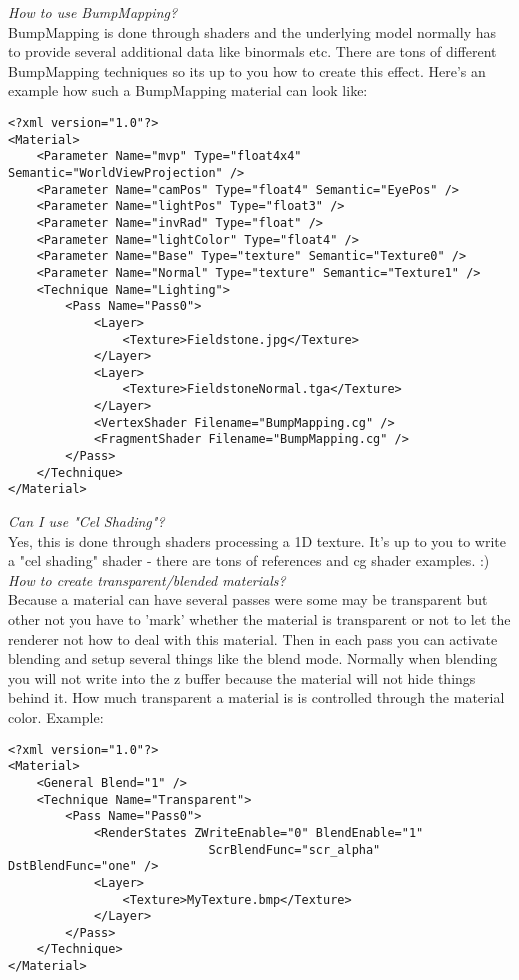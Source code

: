 \emph{How to use BumpMapping?}\\
BumpMapping is done through shaders and the underlying model normally has to provide several
additional data like binormals etc. There are tons of different BumpMapping techniques so its
up to you how to create this effect. Here's an example how such a BumpMapping material can look
like:\\

\begin{lstlisting}[caption=BumpMapping]
<?xml version="1.0"?>
<Material>
	<Parameter Name="mvp" Type="float4x4" Semantic="WorldViewProjection" />
	<Parameter Name="camPos" Type="float4" Semantic="EyePos" />
	<Parameter Name="lightPos" Type="float3" />
	<Parameter Name="invRad" Type="float" />
	<Parameter Name="lightColor" Type="float4" />
	<Parameter Name="Base" Type="texture" Semantic="Texture0" />
	<Parameter Name="Normal" Type="texture" Semantic="Texture1" />
	<Technique Name="Lighting">
		<Pass Name="Pass0">
			<Layer>
				<Texture>Fieldstone.jpg</Texture>
			</Layer>
			<Layer>
				<Texture>FieldstoneNormal.tga</Texture>
			</Layer>
			<VertexShader Filename="BumpMapping.cg" />
			<FragmentShader Filename="BumpMapping.cg" />
		</Pass>
	</Technique>
</Material>
\end{lstlisting}


\emph{Can I use "Cel Shading"?}\\
Yes, this is done through shaders processing a 1D texture. It's up to you to write a "cel shading"
shader - there are tons of references and cg shader examples. :)\\


\emph{How to create transparent/blended materials?}\\
Because a material can have several passes were some may be transparent but other not you have
to 'mark' whether the material is transparent or not to let the renderer not how to deal with
this material. Then in each pass you can activate blending and setup several things like the blend
mode. Normally when blending you will not write into the z buffer because the material will not
hide things behind it. How much transparent a material is is controlled through the material color.
Example:\\

\begin{lstlisting}[caption=Transparent/blended material]
<?xml version="1.0"?>
<Material>
	<General Blend="1" />
	<Technique Name="Transparent">
		<Pass Name="Pass0">
			<RenderStates ZWriteEnable="0" BlendEnable="1" 
							ScrBlendFunc="scr_alpha" DstBlendFunc="one" />
			<Layer>
				<Texture>MyTexture.bmp</Texture>
			</Layer>
		</Pass>
	</Technique>
</Material>
\end{lstlisting}
